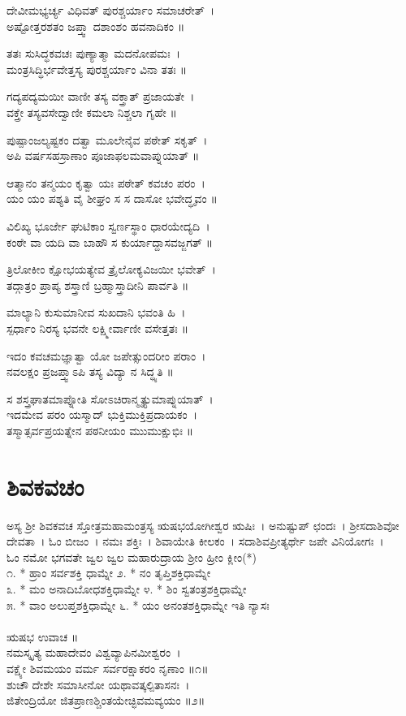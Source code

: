 ದೇವೀಮಭ್ಯರ್ಚ್ಯ ವಿಧಿವತ್ ಪುರಶ್ಚರ್ಯಾಂ ಸಮಾಚರೇತ್~।\\
ಅಷ್ಟೋತ್ತರಶತಂ ಜಪ್ತ್ವಾ ದಶಾಂಶಂ ಹವನಾದಿಕಂ ॥

ತತಃ ಸುಸಿದ್ಧಕವಚಃ ಪುಣ್ಯಾತ್ಮಾ ಮದನೋಪಮಃ~।\\
ಮಂತ್ರಸಿದ್ಧಿರ್ಭವೇತ್ತಸ್ಯ ಪುರಶ್ಚರ್ಯಾಂ ವಿನಾ ತತಃ ॥

ಗದ್ಯಪದ್ಯಮಯೀ ವಾಣೀ ತಸ್ಯ ವಕ್ತ್ರಾತ್ ಪ್ರಜಾಯತೇ~।\\
ವಕ್ತ್ರೇ ತಸ್ಯವಸೇದ್ವಾಣೀ ಕಮಲಾ ನಿಶ್ಚಲಾ ಗೃಹೇ ॥

ಪುಷ್ಪಾಂಜಲ್ಯಷ್ಟಕಂ ದತ್ವಾ ಮೂಲೇನೈವ ಪಠೇತ್ ಸಕೃತ್~।\\
ಅಪಿ ವರ್ಷಸಹಸ್ರಾಣಾಂ ಪೂಜಾಫಲಮವಾಪ್ನುಯಾತ್ ॥

ಆತ್ಮಾನಂ ತನ್ಮಯಂ ಕೃತ್ವಾ ಯಃ ಪಠೇತ್ ಕವಚಂ ಪರಂ~।\\
ಯಂ ಯಂ ಪಶ್ಯತಿ ವೈ ಶೀಘ್ರಂ ಸ ಸ ದಾಸೋ ಭವೇದ್ಧೃವಂ ॥

ವಿಲಿಖ್ಯ ಭೂರ್ಜೇ ಘುಟಿಕಾಂ ಸ್ವರ್ಣಸ್ಥಾಂ ಧಾರಯೇದ್ಯದಿ~।\\
ಕಂಠೇ ವಾ ಯದಿ ವಾ ಬಾಹೌ ಸ ಕುರ್ಯಾದ್ದಾಸವಜ್ಜಗತ್ ॥

ತ್ರಿಲೋಕೀಂ ಕ್ಷೋಭಯತ್ಯೇವ ತ್ರೈಲೋಕ್ಯವಿಜಯೀ ಭವೇತ್~।\\
ತದ್ಗಾತ್ರಂ ಪ್ರಾಪ್ಯ ಶಸ್ತ್ರಾಣಿ ಬ್ರಹ್ಮಾಸ್ತ್ರಾದೀನಿ ಪಾರ್ವತಿ ॥

ಮಾಲ್ಯಾನಿ ಕುಸುಮಾನೀವ ಸುಖದಾನಿ ಭವಂತಿ ಹಿ~।\\
ಸ್ಪರ್ಧಾಂ ನಿರಸ್ಯ ಭವನೇ ಲಕ್ಷ್ಮೀರ್ವಾಣೀ ವಸೇತ್ತತಃ ॥

ಇದಂ ಕವಚಮಜ್ಞಾತ್ವಾ ಯೋ ಜಪೇತ್ಸುಂದರೀಂ ಪರಾಂ~।\\
ನವಲಕ್ಷಂ ಪ್ರಜಪ್ತ್ವಾಽಪಿ ತಸ್ಯ ವಿದ್ಯಾ ನ ಸಿದ್ಧ್ಯತಿ ॥

ಸ ಶಸ್ತ್ರಘಾತಮಾಪ್ನೋತಿ ಸೋಽಚಿರಾನ್ಮೃತ್ಯುಮಾಪ್ನುಯಾತ್~।\\
ಇದಮೇವ ಪರಂ ಯಸ್ಮಾದ್ ಭುಕ್ತಿಮುಕ್ತಿಪ್ರದಾಯಕಂ~।\\
ತಸ್ಮಾತ್ಸರ್ವಪ್ರಯತ್ನೇನ ಪಠನೀಯಂ ಮುುಮುಕ್ಷುಭಿಃ ॥


\section{ಶಿವಕವಚಂ }
ಅಸ್ಯ ಶ್ರೀ ಶಿವಕವಚ ಸ್ತೋತ್ರಮಹಾಮಂತ್ರಸ್ಯ ಋಷಭಯೋಗೀಶ್ವರ ಋಷಿಃ~। ಅನುಷ್ಟುಪ್ ಛಂದಃ~। ಶ್ರೀಸದಾಶಿವೋ ದೇವತಾ~। ಓಂ ಬೀಜಂ~। ನಮಃ ಶಕ್ತಿಃ~। ಶಿವಾಯೇತಿ ಕೀಲಕಂ~। ಸದಾಶಿವಪ್ರೀತ್ಯರ್ಥೇ ಜಪೇ ವಿನಿಯೋಗಃ~।\\
ಓಂ ನಮೋ ಭಗವತೇ ಜ್ವಲ ಜ್ವಲ ಮಹಾರುದ್ರಾಯ ಶ್ರೀಂ ಹ್ರೀಂ ಕ್ಲೀಂ(*)\\೧. * ಹ್ರಾಂ ಸರ್ವಶಕ್ತಿ ಧಾಮ್ನೇ
೨. * ನಂ ತೃಪ್ತಿಶಕ್ತಿಧಾಮ್ನೇ\\
೩. * ಮಂ ಅನಾದಿಬೋಧಶಕ್ತಿಧಾಮ್ನೇ
೪. * ಶಿಂ ಸ್ವತಂತ್ರಶಕ್ತಿಧಾಮ್ನೇ\\
೫. * ವಾಂ ಅಲುಪ್ತಶಕ್ತಿಧಾಮ್ನೇ
೬. * ಯಂ ಅನಂತಶಕ್ತಿಧಾಮ್ನೇ ಇತಿ ನ್ಯಾಸಃ\\
\\
ಋಷಭ ಉವಾಚ ॥\\
ನಮಸ್ಕೃತ್ಯ ಮಹಾದೇವಂ ವಿಶ್ವವ್ಯಾಪಿನಮೀಶ್ವರಂ~।\\
ವಕ್ಷ್ಯೇ ಶಿವಮಯಂ ವರ್ಮ ಸರ್ವರಕ್ಷಾಕರಂ ನೃಣಾಂ ॥೧॥\\
ಶುಚೌ ದೇಶೇ ಸಮಾಸೀನೋ ಯಥಾವತ್ಕಲ್ಪಿತಾಸನಃ~।\\
ಜಿತೇಂದ್ರಿಯೋ ಜಿತಪ್ರಾಣಶ್ಚಿಂತಯೇಚ್ಛಿವಮವ್ಯಯಂ ॥೨॥

